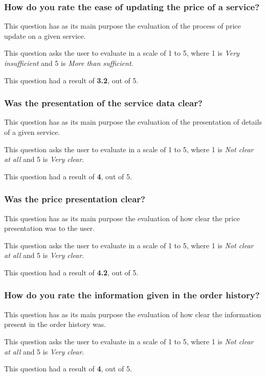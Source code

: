 \subsubsection{How do you rate the ease of updating the price of a service?}

This question has as its main purpose the evaluation of the process of price update on a given service.
\par 
This question asks the user to evaluate in a scale of 1 to 5, where 1 is \textit{Very insufficient} and 5 is \textit{More than sufficient}. 
\par
This question had a result of \textbf{3.2}, out of 5. 

\subsubsection{Was the presentation of the service data clear?}

This question has as its main purpose the evaluation of the presentation of details of a given service.
\par 
This question asks the user to evaluate in a scale of 1 to 5, where 1 is \textit{Not clear at all} and 5 is \textit{Very clear}. 
\par
This question had a result of \textbf{4}, out of 5. 

\subsubsection{Was the price presentation clear?}

This question has as its main purpose the evaluation of how clear the price presentation was to the user.
\par 
This question asks the user to evaluate in a scale of 1 to 5, where 1 is \textit{Not clear at all} and 5 is \textit{Very clear}. 
\par
This question had a result of \textbf{4.2}, out of 5.

\subsubsection{How do you rate the information given in the order history?}

This question has as its main purpose the evaluation of how clear the information present in the order history was.
\par 
This question asks the user to evaluate in a scale of 1 to 5, where 1 is \textit{Not clear at all} and 5 is \textit{Very clear}. 
\par
This question had a result of \textbf{4}, out of 5.

